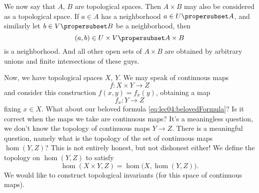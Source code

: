We now say that $A$, $B$ are topological spaces. Then $A\times B$
may also be considered as a topological space. If $a\in A$ has  a
neighborhood $a\in U\propersubset A$, and similarly let $b\in
V\propersubset B$ be a neighborhood, then
\begin{equation}
(a,b)\in U\times V\propersubset A\times B
\end{equation}
is a neighborhood.  And all other open sets of $A\times B$ are
obtained by arbitrary unions and finite intersections of these
guys.

Now, we have topological spaces $X$, $Y$. We may speak of
continuous maps
\begin{equation}
f\colon X\times Y\to Z
\end{equation}
and consider this construction $f(x,y)=f_{x}(y)$, obtaining a map
\begin{equation}\label{eq:lec04:belovedFormula}
f_{x}\colon Y\to Z
\end{equation}
fixing $x\in X$. What about our beloved formula \eqref{eq:lec04:belovedFormula}? Is it correct
when the maps we take are continuous maps? It's a meaningless
question, we don't know the topology of continuous maps $Y\to
Z$. There is a meaningful question, namely what is the topology
of the set of continuous maps $\hom(Y,Z)$? This is not entirely
honest, but not dishonest either! We define the topology on
$\hom(Y,Z)$ to satisfy
\begin{equation}
\hom(X\times Y,Z)=\hom\bigl(X,\hom(Y,Z)\bigr).
\end{equation}
We would like to construct topological invariants (for this space
of continuous maps). 

